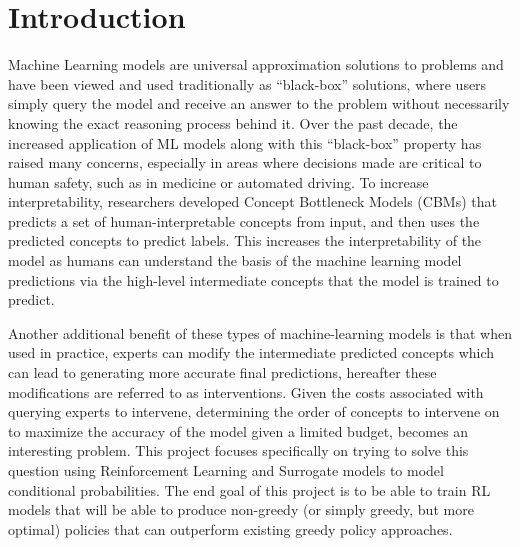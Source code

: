 \documentclass[../main.tex]{subfiles}
\begin{document}
\chapter{Introduction}
\label{firstcontentpage}
Machine Learning models are universal approximation solutions to problems
and have been viewed and used traditionally as “black-box” solutions, 
where users simply query the model and receive an answer to the problem without 
necessarily knowing the exact reasoning process behind it. Over the past decade,
the increased application of ML models along with this “black-box” property has
raised many concerns, especially in areas where decisions made are critical to
human safety, such as in medicine or automated driving. To increase
interpretability, researchers developed Concept Bottleneck Models (CBMs) that 
predicts a set of human-interpretable concepts from input, and then uses the
predicted concepts to predict labels. This increases the interpretability of the model 
as humans
can understand the basis of the machine learning model predictions via the high-level 
intermediate concepts that the model is trained to predict. 

Another 
additional benefit of these types of machine-learning models is that when used in
practice, experts can modify the intermediate predicted concepts which can
lead to generating more accurate final predictions, hereafter these modifications are
referred to as interventions.
Given the costs associated with querying experts to intervene,
determining the order of concepts to intervene on to maximize 
the accuracy of the model given a limited budget, becomes an interesting problem.
This project focuses specifically on trying to solve this question using Reinforcement 
Learning and Surrogate models to model conditional probabilities. 
The end goal of this project is to be able to train RL models that will be able to 
produce non-greedy (or simply greedy, but more optimal) policies that can outperform 
existing greedy policy approaches. 
\end{document}
